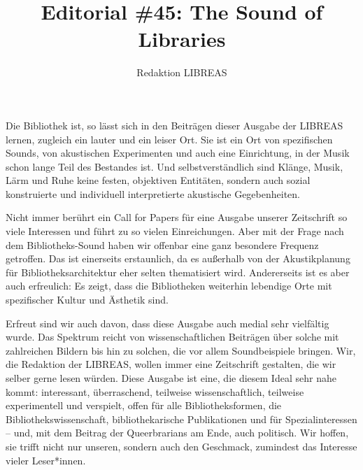 \documentclass[a4paper,
fontsize=11pt,
oneside,
numbers=noperiodatend,
parskip=half-,
bibliography=totoc,
final
]{scrartcl}
\title{\LARGE{Editorial \#45: The Sound of Libraries}}%
\author{Redaktion LIBREAS} %
\date{}
\begin{document}
\maketitle
\thispagestyle{fancyplain} 


Die Bibliothek ist, so lässt sich in den Beiträgen dieser Ausgabe der
LIBREAS lernen, zugleich ein lauter und ein leiser Ort. Sie ist ein Ort
von spezifischen Sounds, von akustischen Experimenten und auch eine
Einrichtung, in der Musik schon lange Teil des Bestandes ist. Und
selbstverständlich sind Klänge, Musik, Lärm und Ruhe keine festen,
objektiven Entitäten, sondern auch sozial konstruierte und individuell
interpretierte akustische Gegebenheiten.

Nicht immer berührt ein Call for Papers für eine Ausgabe unserer
Zeitschrift so viele Interessen und führt zu so vielen Einreichungen.
Aber mit der Frage nach dem Bibliotheks-Sound haben wir offenbar eine
ganz besondere Frequenz getroffen. Das ist einerseits erstaunlich, da es
außerhalb von der Akustikplanung für Bibliotheksarchitektur eher selten
thematisiert wird. Andererseits ist es aber auch erfreulich: Es zeigt,
dass die Bibliotheken weiterhin lebendige Orte mit spezifischer Kultur
und Ästhetik sind.

Erfreut sind wir auch davon, dass diese Ausgabe auch medial sehr
vielfältig wurde. Das Spektrum reicht von wissenschaftlichen Beiträgen
über solche mit zahlreichen Bildern bis hin zu solchen, die vor allem
Soundbeispiele bringen. Wir, die Redaktion der LIBREAS, wollen immer
eine Zeitschrift gestalten, die wir selber gerne lesen würden. Diese
Ausgabe ist eine, die diesem Ideal sehr nahe kommt: interessant,
überraschend, teilweise wissenschaftlich, teilweise experimentell und
verspielt, offen für alle Bibliotheksformen, die
Bibliothekswissenschaft, bibliothekarische Publikationen und für
Spezialinteressen -- und, mit dem Beitrag der Queerbrarians am Ende,
auch politisch. Wir hoffen, sie trifft nicht nur unseren, sondern auch
den Geschmack, zumindest das Interesse vieler Leser*innen.
\end{document}
